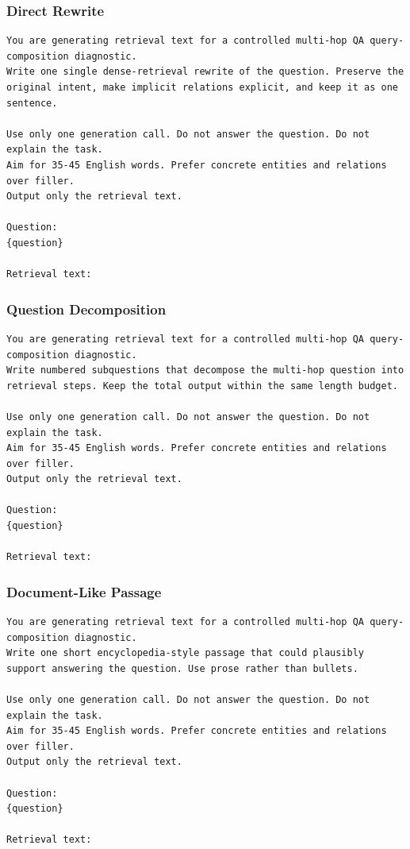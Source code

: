\documentclass[10pt]{article}
\begin{document}
\subsubsection*{Direct Rewrite}
\begingroup\footnotesize
\begin{Verbatim}[breaklines=true,breakanywhere=false,breaksymbolleft={},breaksymbolright={}]
You are generating retrieval text for a controlled multi-hop QA query-composition diagnostic.
Write one single dense-retrieval rewrite of the question. Preserve the original intent, make implicit relations explicit, and keep it as one sentence.

Use only one generation call. Do not answer the question. Do not explain the task.
Aim for 35-45 English words. Prefer concrete entities and relations over filler.
Output only the retrieval text.

Question:
{question}

Retrieval text:
\end{Verbatim}
\endgroup

\subsubsection*{Question Decomposition}
\begingroup\footnotesize
\begin{Verbatim}[breaklines=true,breakanywhere=false,breaksymbolleft={},breaksymbolright={}]
You are generating retrieval text for a controlled multi-hop QA query-composition diagnostic.
Write numbered subquestions that decompose the multi-hop question into retrieval steps. Keep the total output within the same length budget.

Use only one generation call. Do not answer the question. Do not explain the task.
Aim for 35-45 English words. Prefer concrete entities and relations over filler.
Output only the retrieval text.

Question:
{question}

Retrieval text:
\end{Verbatim}
\endgroup

\subsubsection*{Document-Like Passage}
\begingroup\footnotesize
\begin{Verbatim}[breaklines=true,breakanywhere=false,breaksymbolleft={},breaksymbolright={}]
You are generating retrieval text for a controlled multi-hop QA query-composition diagnostic.
Write one short encyclopedia-style passage that could plausibly support answering the question. Use prose rather than bullets.

Use only one generation call. Do not answer the question. Do not explain the task.
Aim for 35-45 English words. Prefer concrete entities and relations over filler.
Output only the retrieval text.

Question:
{question}

Retrieval text:
\end{Verbatim}
\endgroup
\end{document}
